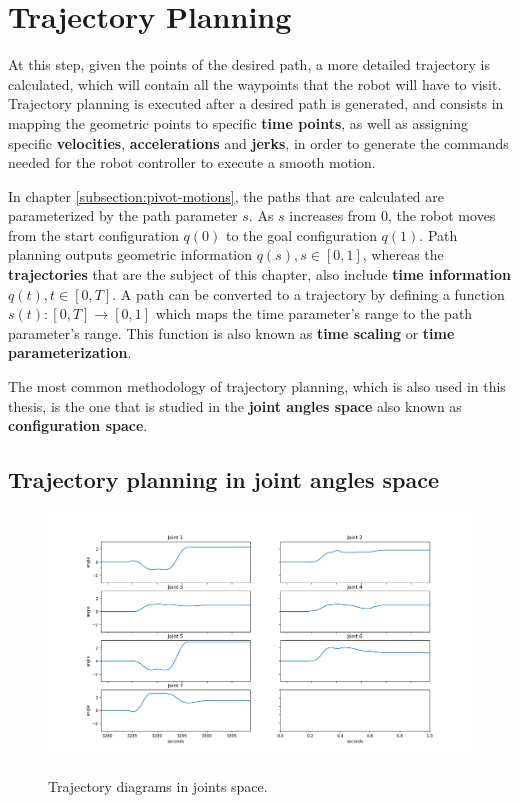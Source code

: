 \section{Trajectory Planning}

At this step, given the points of the desired path, a more detailed trajectory is calculated, 
which will contain all the waypoints that the robot will have to visit. Trajectory planning is executed after a desired path is generated,
and consists in mapping the geometric points to specific \textbf{time points}, as well as assigning specific \textbf{velocities}, \textbf{accelerations} and \textbf{jerks}, 
in order to generate the commands needed for the robot controller to execute a smooth motion.

In chapter \ref{subsection:pivot-motions}, the paths that are calculated are parameterized by the path parameter $s$. As $s$ increases from $0$, the robot moves from the start configuration $q(0)$ to the goal configuration $q(1)$. 
Path planning outputs geometric information $q(s), s \in [0, 1]$, whereas the \textbf{trajectories} that are the subject of this chapter, also include \textbf{time information} $q(t), t \in [0, T]$. 
A path can be converted to a trajectory by defining a function $s(t): [0, T] \rightarrow [0, 1]$ which maps the time parameter's range to the path parameter's range. This function is also known as \textbf{time scaling} or 
\textbf{time parameterization}.

The most common methodology of trajectory planning, which is also used in this thesis, is the one that is studied in the \textbf{joint angles space} also known as \textbf{configuration space}.

\subsection{Trajectory planning in joint angles space}

\begin{center}
\begin{figure}[H]
\centering
\includegraphics[width=\textwidth]{images/trajectory1-test1.png}\\
\caption{Trajectory diagrams in joints space.}
\end{figure}
\end{center}


